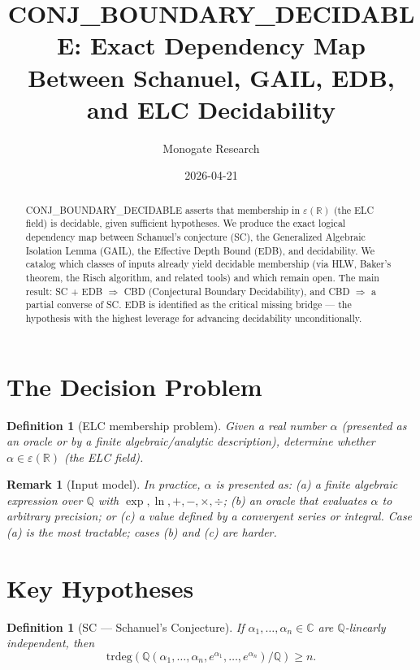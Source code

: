 \documentclass[11pt]{article}
\title{CONJ\_BOUNDARY\_DECIDABLE: Exact Dependency Map\\
Between Schanuel, GAIL, EDB, and ELC Decidability}
\author{Monogate Research}
\date{2026-04-21}
\newtheorem{definition}[theorem]{Definition}
\newtheorem{remark}[theorem]{Remark}
\begin{document}
\maketitle

\begin{abstract}
CONJ\_BOUNDARY\_DECIDABLE asserts that membership in $\varepsilon(\mathbb{R})$
(the ELC field) is decidable, given sufficient hypotheses.
We produce the exact logical dependency map between Schanuel's conjecture (SC),
the Generalized Algebraic Isolation Lemma (GAIL), the Effective Depth Bound (EDB),
and decidability.
We catalog which classes of inputs already yield decidable membership
(via HLW, Baker's theorem, the Risch algorithm, and related tools)
and which remain open.
The main result: SC + EDB $\Rightarrow$ CBD (Conjectural Boundary Decidability),
and CBD $\Rightarrow$ a partial converse of SC.
EDB is identified as the critical missing bridge — the hypothesis with the
highest leverage for advancing decidability unconditionally.
\end{abstract}

\section{The Decision Problem}

\begin{definition}[ELC membership problem]
Given a real number $\alpha$ (presented as an oracle or by a finite algebraic/analytic description),
determine whether $\alpha \in \varepsilon(\mathbb{R})$ (the ELC field).
\end{definition}

\begin{remark}[Input model]
In practice, $\alpha$ is presented as:
(a) a finite algebraic expression over $\mathbb{Q}$ with $\exp, \ln, +, -, \times, \div$;
(b) an oracle that evaluates $\alpha$ to arbitrary precision; or
(c) a value defined by a convergent series or integral.
Case (a) is the most tractable; cases (b) and (c) are harder.
\end{remark}

\section{Key Hypotheses}

\begin{definition}[SC — Schanuel's Conjecture]
If $\alpha_1, \ldots, \alpha_n \in \mathbb{C}$ are $\mathbb{Q}$-linearly independent, then
\[
\mathrm{trdeg}(\mathbb{Q}(\alpha_1, \ldots, \alpha_n, e^{\alpha_1}, \ldots, e^{\alpha_n})/\mathbb{Q}) \geq n.
\]
\end{definition}
\end{document}
